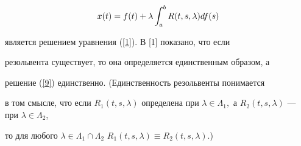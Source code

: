 \begin{equation}\label{9}


x(t)=f(t)+\lambda\integral{a}{b}R(t,s,\lambda)df(s)


\end{equation}


является решением уравнения (\ref{1}). В [1] показано, что если


резольвента существует, то она определяется единственным образом, а


решение (\ref{9}) единственно. (Единственность резольвенты понимается


в том смысле, что если $R_1(t,s,\lambda)$ определена при $\lambda


\in\Lambda_1,$ а $R_2(t,s,\lambda)$ --- при $\lambda\in\Lambda_2$,


то для любого $\lambda\in\Lambda_1\cap\Lambda_2$\; $R_1(t,s,\lambda)


\equiv R_2(t,s,\lambda).$)





